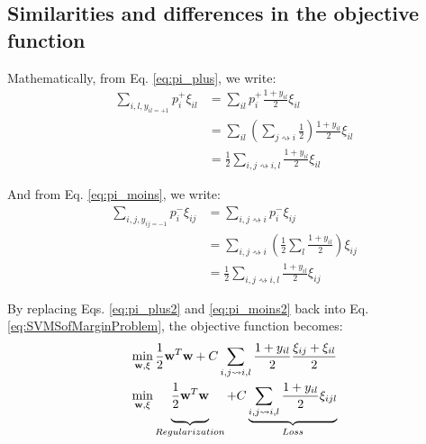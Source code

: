 \subsection{Similarities and differences in the objective function}
\label{sec:relationship}

\noindent Mathematically, from Eq. \ref{eq:pi_plus}, we write:
\begin{align}
\sum\limits_{i,l,y_{il=+1}}p_i^+\xi_{il} 
& = 
\sum_{il}p_i^+   \frac{1+y_{il}}{2}  \xi_{il} \nonumber\\
& = 
\sum_{il} \left( \sum_{j \rightsquigarrow i} \frac{1}{2}\right)  \frac{1+y_{il}}{2}  \xi_{il} \nonumber\\
& =
\frac{1}{2}\sum_{i,j \rightsquigarrow i, l} \frac{1+y_{il}}{2}\xi_{il} \label{eq:pi_plus2}
\end{align}

\noindent And from Eq. \ref{eq:pi_moins}, we write:
\begin{align}
\sum\limits_{i,j, y_{ij=-1}}p_i^-\xi_{ij} 
& = 
\sum_{i,j \rightsquigarrow i}p_i^-\xi_{ij} \nonumber \\
& =
\sum_{i,j \rightsquigarrow i} \left( \frac{1}{2}\sum_l \frac{1+y_{il}}{2} \right) \xi_{ij} \nonumber \\
& =
\frac{1}{2}\sum_{i,j \rightsquigarrow i, l} \frac{1+y_{il}}{2}\xi_{ij} \label{eq:pi_moins2}
\end{align}

\noindent By replacing Eqs. \ref{eq:pi_plus2} and \ref{eq:pi_moins2} back into Eq. \ref{eq:SVMSofMarginProblem}, the objective function becomes:
\begin{align}
&\displaystyle \min_{\textbf{w},\xi} 
\frac{1}{2}\textbf{w}^T \textbf{w}
 + C\sum_{i,j \rightsquigarrow i ,l}\frac{1+y_{il}}{2}\frac{\xi_{ij}+\xi_{il}}{2} \nonumber \\
&\displaystyle \min_{\textbf{w},\xi} 
\underbrace{ 
	\vphantom{ \sum\limits_{i,j \rightsquigarrow i,l} }
	\frac{1}{2}\textbf{w}^T \textbf{w}
}_{Regularization}
 + C \underbrace{
	\sum_{i,j \rightsquigarrow i ,l}
	\frac{1+y_{il}}{2} \xi_{ijl} 
}_{Loss}
\label{eq:svm2}
\end{align}	
%

